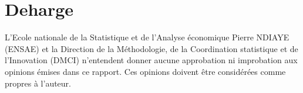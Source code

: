 \chapter*{Deharge}

\vspace{4cm}


\begin{mybluebox}

L’Ecole nationale de la Statistique et de l’Analyse économique Pierre NDIAYE (ENSAE) et la Direction de la Méthodologie, de la Coordination statistique et de l’Innovation (DMCI) n’entendent donner aucune approbation ni improbation aux opinions émises dans ce rapport. Ces opinions doivent être considérées comme propres à l’auteur.

\end{mybluebox}
